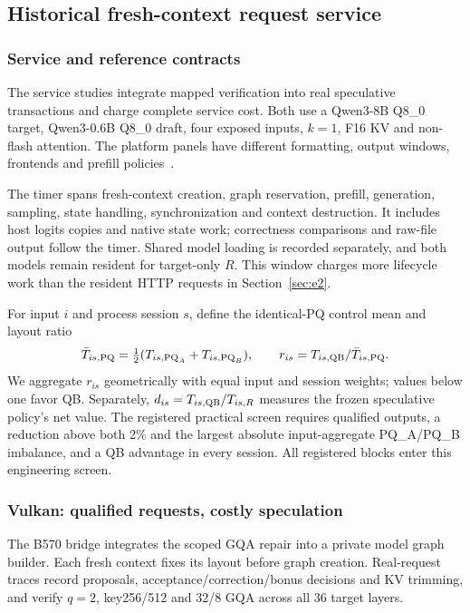 \subsection{Historical fresh-context request service}
\label{sec:service}
\subsubsection{Service and reference contracts}
The service studies integrate mapped verification into real speculative transactions and charge complete service cost. Both use a Qwen3-8B Q8\_0 target, Qwen3-0.6B Q8\_0 draft, four exposed inputs, $k=1$, F16 KV and non-flash attention. The platform panels have different formatting, output windows, frontends and prefill policies~\cite{b570servicerecords,rtxservicerecords}.

The timer spans fresh-context creation, graph reservation, prefill, generation, sampling, state handling, synchronization and context destruction. It includes host logits copies and native state work; correctness comparisons and raw-file output follow the timer. Shared model loading is recorded separately, and both models remain resident for target-only $R$. This window charges more lifecycle work than the resident HTTP requests in Section~\ref{sec:e2}.

For input $i$ and process session $s$, define the identical-PQ control mean and layout ratio
\begin{equation}
\bar T_{is,\mathrm{PQ}}=\tfrac12(T_{is,\mathrm{PQ}_A}+T_{is,\mathrm{PQ}_B}),\qquad
r_{is}=T_{is,\mathrm{QB}}/\bar T_{is,\mathrm{PQ}}.
\label{eq:servicepair}
\end{equation}
We aggregate $r_{is}$ geometrically with equal input and session weights; values below one favor QB. Separately, $d_{is}=T_{is,\mathrm{QB}}/T_{is,R}$ measures the frozen speculative policy's net value. The registered practical screen requires qualified outputs, a reduction above both 2\% and the largest absolute input-aggregate PQ\_A/PQ\_B imbalance, and a QB advantage in every session. All registered blocks enter this engineering screen.

\subsubsection{Vulkan: qualified requests, costly speculation}
The B570 bridge integrates the scoped GQA repair into a private model graph builder. Each fresh context fixes its layout before graph creation. Real-request traces record proposals, acceptance/correction/bonus decisions and KV trimming, and verify $q=2$, key256/512 and 32/8 GQA across all 36 target layers.

